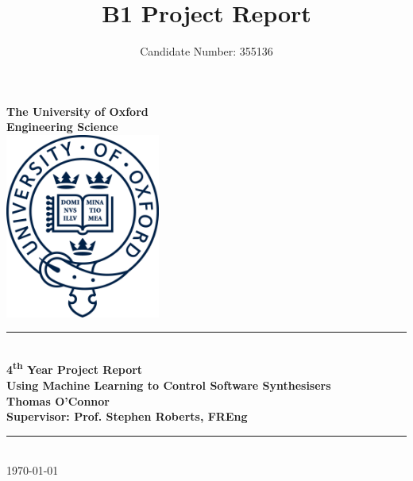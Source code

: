 \documentclass[11pt, oneside]{report}   	%
\title{B1 Project Report}
\author{Candidate Number: 355136}
\date{}							%
\begin{document}

\begin{titlepage}
\begin{center}
\vspace*{1cm}
\Large {\textbf{The University of Oxford}}\\
\Large{\textbf{Engineering Science}}\\
\vspace{2cm}
\includegraphics[width = 2in]{OxfordLogo.png}
\vfill
\noindent\rule{5.5in}{0.6pt}\\[1mm]
\huge{\textbf{4\textsuperscript{th} Year Project Report}}\\[3mm]
\Large{\textbf{Using Machine Learning to Control Software Synthesisers}}\\[1mm]
\Large{\textbf{Thomas O'Connor}}\\[1mm]
\Large{\textbf{Supervisor: Prof. Stephen Roberts, FREng}}\\[1mm]
\noindent\rule{5.5in}{0.6pt}\\[1mm]
\vspace{2cm}
\vfill
\today\\
\end{center}
\end{titlepage}
\end{document}
